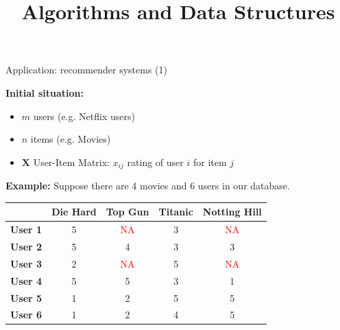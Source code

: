 \documentclass[11pt,compress,t,notes=noshow, xcolor=table]{beamer}
\title{Algorithms and Data Structures}
\begin{document}

\begin{vbframe}{Application: recommender systems (1)}

\textbf{Initial situation:}
\begin{itemize}
\item $m$ users (e.g. Netflix users)
\item $n$ items (e.g. Movies)
\item $\mathbf{X}$ User-Item Matrix: $x_{ij}$ rating of user $i$ for item $j$
\end{itemize}

\vspace*{0.5cm}

\textbf{Example:} Suppose there are 4 movies and 6 users in our database.

\vspace*{0.5cm}

\begin{footnotesize}
\begin{center}
\begin{table}[h!]
    \centering
    \begin{tabular}{|l|c|c|c|c|}
    \hline
           & \textbf{Die Hard} & \textbf{Top Gun} & \textbf{Titanic} & \textbf{Notting Hill} \\ \hline
    \textbf{User 1} & 5 & \textcolor{red}{NA} & 3 & \textcolor{red}{NA} \\ \hline
    \textbf{User 2} & 5 & 4 & 3 & 3 \\ \hline
    \textbf{User 3} & 2 & \textcolor{red}{NA} & 5 & \textcolor{red}{NA} \\ \hline
    \textbf{User 4} & 5 & 5 & 3 & 1 \\ \hline
    \textbf{User 5} & 1 & 2 & 5 & 5 \\ \hline
    \textbf{User 6} & 1 & 2 & 4 & 5 \\ \hline
    \end{tabular}
  \end{table}    
\end{center}
\end{footnotesize}


\end{vbframe}
\end{document}
